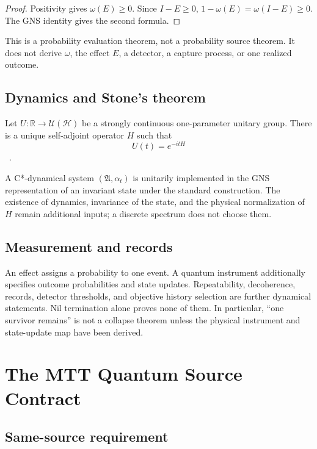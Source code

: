 \documentclass[11pt]{article}
\newcommand{\Hilb}{\mathcal H}
\newcommand{\Alg}{\mathfrak A}
\begin{document}
\begin{proof}
Positivity gives $\omega(E)\ge0$.  Since $I-E\ge0$,
$1-\omega(E)=\omega(I-E)\ge0$.  The GNS identity gives the second formula.
\end{proof}

This is a probability evaluation theorem, not a probability source theorem.
It does not derive $\omega$, the effect $E$, a detector, a capture process, or
one realized outcome.

\subsection{Dynamics and Stone's theorem}

\begin{theorem}\label{thm:stone}
Let $U:\mathbb R\to\mathcal U(\Hilb)$ be a strongly continuous one-parameter
unitary group.  There is a unique self-adjoint operator $H$ such that
\[
 U(t)=e^{-itH}
\]
~\cite{Stone}.
\end{theorem}

A C*-dynamical system $(\Alg,\alpha_t)$ is unitarily implemented in the GNS
representation of an invariant state under the standard construction.  The
existence of dynamics, invariance of the state, and the physical normalization
of $H$ remain additional inputs; a discrete spectrum does not choose them.

\subsection{Measurement and records}

An effect assigns a probability to one event.  A quantum instrument additionally
specifies outcome probabilities and state updates.  Repeatability, decoherence,
records, detector thresholds, and objective history selection are further
dynamical statements.  Nil termination alone proves none of them.  In
particular, ``one survivor remains'' is not a collapse theorem unless the
physical instrument and state-update map have been derived.

\section{The MTT Quantum Source Contract}

\subsection{Same-source requirement}
\end{document}
